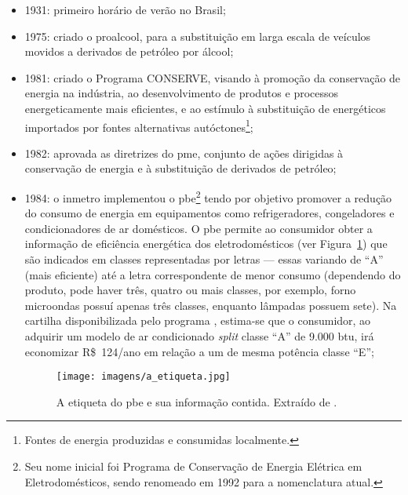 \begin{itemize}
\item 1931: primeiro horário de verão no Brasil;
\item 1975: criado o \gls{proalcool}, para a substituição em larga
escala de veículos movidos a derivados de petróleo por álcool; 
\item 1981: criado o Programa CONSERVE, visando à promoção da
conservação de energia na indústria, ao desenvolvimento de produtos e
processos energeticamente mais eficientes, e ao estímulo à
substituição de energéticos importados por fontes alternativas
autóctones\footnote{Fontes de energia produzidas e consumidas
localmente.};
\item 1982: aprovada as diretrizes do \gls{pme}, conjunto de ações
dirigidas à conservação de energia e à substituição de derivados de
petróleo;
\item 1984: o \gls{inmetro} implementou o \gls{pbe}\footnote{Seu nome
inicial foi Programa de Conservação de Energia Elétrica em
Eletrodomésticos, sendo renomeado em 1992 para a nomenclatura atual.}
tendo por objetivo promover a redução do consumo de energia em
equipamentos como refrigeradores, congeladores e condicionadores de ar
domésticos. O \gls{pbe} permite ao consumidor obter a informação de
eficiência energética dos eletrodomésticos (ver
Figura~\ref{fig:pbe_etiqueta}) que são indicados em classes
representadas por letras --- essas variando de ``A'' (mais eficiente)
até a letra correspondente de menor consumo (dependendo do produto,
pode haver três, quatro ou mais classes, por exemplo, forno microondas
possuí apenas três classes, enquanto lâmpadas possuem sete). Na
cartilha disponibilizada pelo programa \cite{pbe_cartilha}, estima-se
que o consumidor, ao adquirir um modelo de ar condicionado \emph{split}
classe ``A'' de 9.000 \acs{btu}, irá economizar R\$~124/ano em relação
a um de mesma potência classe ``E'';

\begin{figure}[h!t]
\centering
\texttt{[image: imagens/a\_etiqueta.jpg]}
\caption[A etiqueta do PBE.]
{A etiqueta do \gls{pbe} e sua informação contida. Extraído de
\cite{pbe_etiqueta}.}
\label{fig:pbe_etiqueta}
\end{figure}



\end{itemize}
